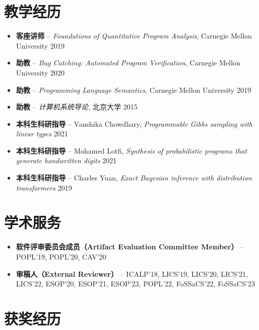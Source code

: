 \documentclass[11pt,letterpaper,roman]{moderncv}        %
\begin{document}
\section{教学经历}

\begin{itemize}
  \item \textbf{客座讲师} -- \emph{Foundations of Quantitative Program Analysis}, Carnegie Mellon University \hfill 2019

  \vspace{4pt}

  \item \textbf{助教} -- \emph{Bug Catching: Automated Program Verification}, Carnegie Mellon University \hfill 2020
  \item \textbf{助教} -- \emph{Programming Language Semantics}, Carnegie Mellon University \hfill 2019
  \item \textbf{助教} -- \emph{计算机系统导论}, 北京大学 \hfill 2015

  \vspace{4pt}

  \item \textbf{本科生科研指导} -- Vanshika Chowdhary, \emph{Programmable Gibbs sampling with linear types} \hfill 2021
  \item \textbf{本科生科研指导} -- Mohamed Lotfi, \emph{Synthesis of probabilistic programs that generate handwritten digits} \hfill 2021
  \item \textbf{本科生科研指导} -- Charles Yuan, \emph{Exact Bayesian inference with distribution transformers} \hfill 2019
\end{itemize}

\section{学术服务}

\begin{itemize}
  \item \textbf{软件评审委员会成员（Artifact Evaluation Committee Member）} -- POPL'19, POPL'20, CAV'20
  \item \textbf{审稿人（External Reviewer）} -- ICALP'18, LICS'19, LICS'20, LICS'21, LICS'22, ESOP'20, ESOP'21, ESOP'23, POPL'22, FoSSaCS'22, FoSSaCS'23
\end{itemize}

\section{获奖经历}
\end{document}
